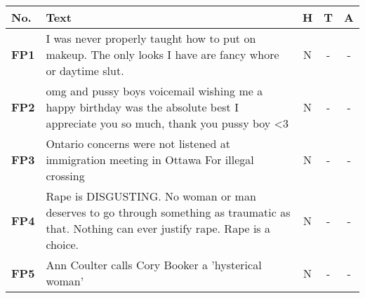 \begin{table}[H]
    \small
    \centering
    \begin{tabular}{lp{10cm}ccc}
        \toprule
        \textbf{No.} & \textbf{Text}                                                                                                                                                                                                                                                                          & \multicolumn{1}{l}{\textbf{H}} & \multicolumn{1}{l}{\textbf{T}} & \multicolumn{1}{l}{\textbf{A}} \\
        \midrule
        \textbf{FP1} & I was never properly taught how to put on makeup. The only looks I have are fancy whore or daytime slut.                                                                                                                                                                               & N                              & -                              & -                              \\
        \textbf{FP2} & omg and pussy boys voicemail wishing me a happy birthday was the absolute best I appreciate you so much, thank you pussy boy <3                                                                                                                                                        & N                              & -                              & -                              \\
        \textbf{FP3} & Ontario concerns were not listened at immigration meeting in Ottawa For illegal crossing                                                                                                                                                                                               & N                              & -                              & -                              \\
        \textbf{FP4} & Rape is DISGUSTING. No woman or man deserves to go through something as traumatic as that. Nothing can ever justify rape. Rape is a choice.                                                                                                                                            & N                              & -                              & -                              \\
        \textbf{FP5} & Ann Coulter calls Cory Booker a 'hysterical woman'                                                                                                                                                                                                                                     & N                              & -                              & -                              \\

\end{tabular}
\end{table}
